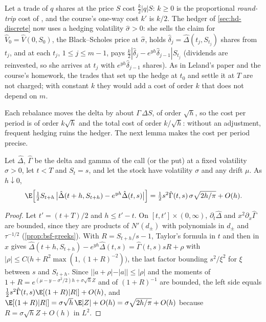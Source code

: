 Let a trade of $q$ shares at the price $S$ cost $\frac k2|q|S$: $k\ge0$ is the proportional
\emph{round-trip} cost of \textcite{leland-1985}, and the course's one-way cost $k'$ is $k/2$. The
hedger of \cref{sec:hd-discrete} now uses a hedging volatility $\hat\sigma>0$: she sells the claim
for $\hat V_0=\hat V(0,S_0)$, the Black--Scholes price at $\hat\sigma$, holds
$\hat\delta_j=\hat\Delta(t_j,S_{t_j})$ shares from $t_j$, and at each $t_j$, $1\le j\le m-1$, pays
$\frac k2|\hat\delta_j-e^{yh}\hat\delta_{j-1}|S_{t_j}$ (dividends are reinvested, so she arrives at $t_j$ with
$e^{yh}\hat\delta_{j-1}$ shares). As in Leland's paper and the course's homework, the trades that
set up the hedge at $t_0$ and settle it at $T$ are not charged; with constant $k$ they would
add a cost of order $k$ that does not depend on $m$.

Each rebalance moves the delta by about $\Gamma\,\Delta S$, of order $\sqrt h$, so the cost per
period is of order $k\sqrt h$ and the total cost of order $k/\sqrt h$: without an adjustment,
frequent hedging ruins the hedger. The next lemma makes the cost per period precise.

\begin{lemma}\label{lem:hd-one-period}
Let $\hat\Delta$, $\hat\Gamma$ be the delta and gamma of the call (or the put) at a fixed volatility
$\hat\sigma>0$, let $t<T$ and $S_t=s$, and let the stock have volatility $\sigma$ and any drift $\mu$. As
$h\downarrow0$,
\[
  \E\Big[\tfrac12S_{t+h}\,\big|\hat\Delta(t+h,S_{t+h})-e^{yh}\hat\Delta(t,s)\big|\Big]
  =\tfrac12s^2\hat\Gamma(t,s)\,\sigma\sqrt{2h/\pi}+O(h).
\]
\end{lemma}

\begin{proof}
Let $t'=(t+T)/2$ and $h\le t'-t$. On $[t,t']\times(0,\infty)$, $\partial_t\hat\Delta$ and $x^2\partial_x\hat\Gamma$
are bounded, since they are products of $N'(d_\pm)$ with polynomials in $d_\pm$ and
$\tau^{-1/2}$ (\cref{prop:bsf-greeks}). With $R=S_{t+h}/s-1$, Taylor's formula in $t$ and then in
$x$ gives
$\hat\Delta(t+h,S_{t+h})-e^{yh}\hat\Delta(t,s)=\hat\Gamma(t,s)sR+\rho$ with
$|\rho|\le C\big(h+R^2\max(1,(1+R)^{-2})\big)$, the last factor bounding $s^2/\xi^2$ for $\xi$ between $s$
and $S_{t+h}$. Since $||a+\rho|-|a||\le|\rho|$ and the moments of $1+R=e^{(\mu-y-\sigma^2/2)h+\sigma\sqrt hZ}$
and of $(1+R)^{-1}$ are bounded, the left side equals
$\frac12s^2\hat\Gamma(t,s)\E[(1+R)|R|]+O(h)$, and
$\E[(1+R)|R|]=\sigma\sqrt h\,\E|Z|+O(h)=\sigma\sqrt{2h/\pi}+O(h)$ because $R=\sigma\sqrt hZ+O(h)$ in $L^2$.
\end{proof}

